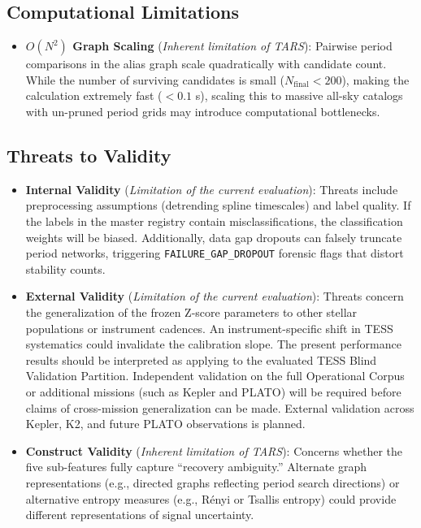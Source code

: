 \subsection{Computational Limitations} \label{sec:limit_computational}
\begin{itemize}
\item \textbf{$O(N^2)$ Graph Scaling} (\textit{Inherent limitation of TARS}): Pairwise period comparisons in the alias graph scale quadratically with candidate count. While the number of surviving candidates is small ($N_{\text{final}} < 200$), making the calculation extremely fast ($< 0.1$ s), scaling this to massive all-sky catalogs with un-pruned period grids may introduce computational bottlenecks.
\end{itemize}

\subsection{Threats to Validity} \label{sec:limit_threats}
\begin{itemize}
\item \textbf{Internal Validity} (\textit{Limitation of the current evaluation}): Threats include preprocessing assumptions (detrending spline timescales) and label quality. If the labels in the master registry contain misclassifications, the classification weights will be biased. Additionally, data gap dropouts can falsely truncate period networks, triggering \texttt{FAILURE\_GAP\_DROPOUT} forensic flags that distort stability counts.
\item \textbf{External Validity} (\textit{Limitation of the current evaluation}): Threats concern the generalization of the frozen Z-score parameters to other stellar populations or instrument cadences. An instrument-specific shift in TESS systematics could invalidate the calibration slope. The present performance results should be interpreted as applying to the evaluated TESS Blind Validation Partition. Independent validation on the full Operational Corpus or additional missions (such as Kepler and PLATO) will be required before claims of cross-mission generalization can be made. External validation across Kepler, K2, and future PLATO observations is planned.
\item \textbf{Construct Validity} (\textit{Inherent limitation of TARS}): Concerns whether the five sub-features fully capture ``recovery ambiguity.'' Alternate graph representations (e.g., directed graphs reflecting period search directions) or alternative entropy measures (e.g., Rényi or Tsallis entropy) could provide different representations of signal uncertainty.
\end{itemize}
